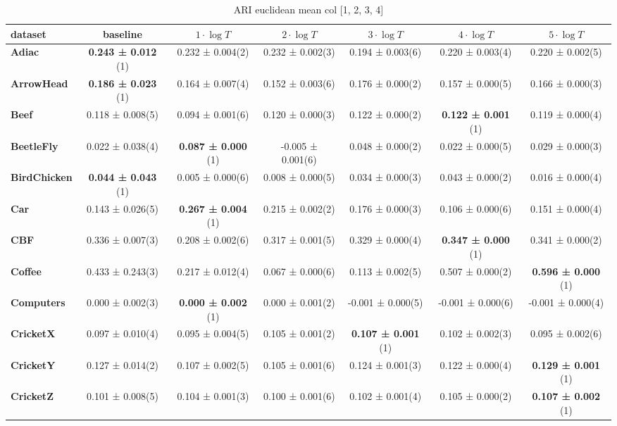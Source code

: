 \begin{table}[ht]
\caption{ARI euclidean mean col [1, 2, 3, 4]} 
\begin{adjustbox}{width=\textwidth}
\begin{tabular}{lcccccc}
\hline
dataset & baseline & \textbf{$1\cdot \log{T}$} & \textbf{$2\cdot \log{T}$} & \textbf{$3\cdot \log{T}$} & \textbf{$4\cdot \log{T}$} & \textbf{$5\cdot \log{T}$} \\ \hline
\textbf{Adiac} & \textbf{0.243 ± 0.012} (1) & 0.232 ± 0.004(2) & 0.232 ± 0.002(3) & 0.194 ± 0.003(6) & 0.220 ± 0.003(4) & 0.220 ± 0.002(5) \\
\textbf{ArrowHead} & \textbf{0.186 ± 0.023} (1) & 0.164 ± 0.007(4) & 0.152 ± 0.003(6) & 0.176 ± 0.000(2) & 0.157 ± 0.000(5) & 0.166 ± 0.000(3) \\
\textbf{Beef} & 0.118 ± 0.008(5) & 0.094 ± 0.001(6) & 0.120 ± 0.000(3) & 0.122 ± 0.000(2) & \textbf{0.122 ± 0.001} (1) & 0.119 ± 0.000(4) \\
\textbf{BeetleFly} & 0.022 ± 0.038(4) & \textbf{0.087 ± 0.000} (1) & -0.005 ± 0.001(6) & 0.048 ± 0.000(2) & 0.022 ± 0.000(5) & 0.029 ± 0.000(3) \\
\textbf{BirdChicken} & \textbf{0.044 ± 0.043} (1) & 0.005 ± 0.000(6) & 0.008 ± 0.000(5) & 0.034 ± 0.000(3) & 0.043 ± 0.000(2) & 0.016 ± 0.000(4) \\
\textbf{Car} & 0.143 ± 0.026(5) & \textbf{0.267 ± 0.004} (1) & 0.215 ± 0.002(2) & 0.176 ± 0.000(3) & 0.106 ± 0.000(6) & 0.151 ± 0.000(4) \\
\textbf{CBF} & 0.336 ± 0.007(3) & 0.208 ± 0.002(6) & 0.317 ± 0.001(5) & 0.329 ± 0.000(4) & \textbf{0.347 ± 0.000} (1) & 0.341 ± 0.000(2) \\
\textbf{Coffee} & 0.433 ± 0.243(3) & 0.217 ± 0.012(4) & 0.067 ± 0.000(6) & 0.113 ± 0.002(5) & 0.507 ± 0.000(2) & \textbf{0.596 ± 0.000} (1) \\
\textbf{Computers} & 0.000 ± 0.002(3) & \textbf{0.000 ± 0.002} (1) & 0.000 ± 0.001(2) & -0.001 ± 0.000(5) & -0.001 ± 0.000(6) & -0.001 ± 0.000(4) \\
\textbf{CricketX} & 0.097 ± 0.010(4) & 0.095 ± 0.004(5) & 0.105 ± 0.001(2) & \textbf{0.107 ± 0.001} (1) & 0.102 ± 0.002(3) & 0.095 ± 0.002(6) \\
\textbf{CricketY} & 0.127 ± 0.014(2) & 0.107 ± 0.002(5) & 0.105 ± 0.001(6) & 0.124 ± 0.001(3) & 0.122 ± 0.000(4) & \textbf{0.129 ± 0.001} (1) \\
\textbf{CricketZ} & 0.101 ± 0.008(5) & 0.104 ± 0.001(3) & 0.100 ± 0.001(6) & 0.102 ± 0.001(4) & 0.105 ± 0.000(2) & \textbf{0.107 ± 0.002} (1) \\

\end{tabular}
\end{adjustbox}
\end{table}
